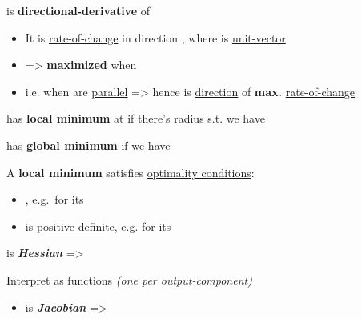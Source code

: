 is \textbf{directional-derivative} of 
\begin{itemize}

      \item
            It is \underline{rate-of-change} in direction , where  is \underline{unit-vector}
      \item
            =>  \textbf{maximized} when 
      \item
            i.e. when  are \underline{parallel} => hence  is
            \underline{direction} of \textbf{max.} \underline{rate-of-change}
\end{itemize}

\hSep %

 has \textbf{local minimum} at  if there's radius 
s.t.  we have 

 has \textbf{global minimum}  if 
we have 

A \textbf{local minimum} satisfies \underline{optimality conditions}:
\begin{itemize}
      \item
            , e.g.~for 
            its 
      \item
             is \underline{positive-definite},
            e.g. for  its 
\end{itemize}

\hSep %

 is \textbf{\emph{Hessian}} =>

Interpret  as  functions 
\emph{(one per output-component)}
\begin{itemize}
      \item
            is \textbf{\emph{Jacobian}} =>
\end{itemize}


